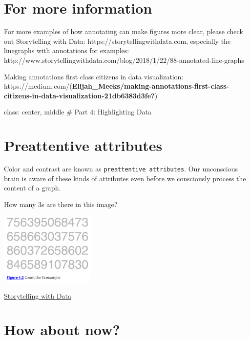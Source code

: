 \documentclass[
  letterpaper,
  DIV=11,
  numbers=noendperiod]{scrreprt}
\begin{document}
\section*{For more information}\label{for-more-information}


For more examples of how annotating can make figures more clear, please
check out Storytelling with Data: https://storytellingwithdata.com,
especially the linegraphs with annotations for examples:
http://www.storytellingwithdata.com/blog/2018/1/22/88-annotated-line-graphs

Making annotations first class citizens in data visualization:
https://medium.com/(\textbf{Elijah\_Meeks/making-annotations-first-class-citizens-in-data-visualization-21db6383d3fe?})

class: center, middle \# Part 4: Highlighting Data

\section*{Preattentive attributes}\label{preattentive-attributes}


Color and contrast are known as \texttt{preattentive\ attributes}. Our
unconscious brain is aware of these kinds of attributes even before we
consciously process the content of a graph.

How many 3s are there in this image?

\includegraphics[width=1.86in,height=\textheight]{image/threes-grey.png}

\href{http://storytellingwithdata.com/}{Storytelling with Data}

\section*{How about now?}\label{how-about-now}
\end{document}
